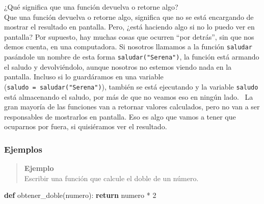 \documentclass[
  letterpaper,
  DIV=11,
  numbers=noendperiod]{scrreprt}
\newenvironment{Shaded}{\begin{snugshade}}{\end{snugshade}}
\newcommand{\ControlFlowTok}[1]{\textcolor[rgb]{0.00,0.23,0.31}{\textbf{#1}}}
\newcommand{\DecValTok}[1]{\textcolor[rgb]{0.68,0.00,0.00}{#1}}
\newcommand{\KeywordTok}[1]{\textcolor[rgb]{0.00,0.23,0.31}{\textbf{#1}}}
\newcommand{\NormalTok}[1]{\textcolor[rgb]{0.00,0.23,0.31}{#1}}
\newcommand{\OperatorTok}[1]{\textcolor[rgb]{0.37,0.37,0.37}{#1}}
\begin{document}
\begin{tcolorbox}[enhanced jigsaw, arc=.35mm, toptitle=1mm, colframe=quarto-callout-note-color-frame, bottomtitle=1mm, opacitybacktitle=0.6, colbacktitle=quarto-callout-note-color!10!white, leftrule=.75mm, coltitle=black, toprule=.15mm, titlerule=0mm, title=\textcolor{quarto-callout-note-color}{\faInfo}\hspace{0.5em}{Return vs Print}, bottomrule=.15mm, rightrule=.15mm, colback=white, breakable, opacityback=0, left=2mm]

¿Qué significa que una función devuelva o retorne algo?\\
Que una función devuelva o retorne algo, significa que no se está
encargando de mostrar el resultado en pantalla. Pero, ¿está haciendo
algo si no lo puedo ver en pantalla? Por supuesto, hay muchas cosas que
ocurren ``por detrás'', sin que nos demos cuenta, en una computadora. Si
nosotros llamamos a la función \texttt{saludar} pasándole un nombre de
esta forma \texttt{saludar("Serena")}, la función está armando el saludo
y devolviéndolo, aunque nosotros no estemos viendo nada en la pantalla.
Incluso si lo guardáramos en una variable
(\texttt{saludo\ =\ saludar("Serena")}), también se está ejecutando y la
variable \texttt{saludo} está almacenando el saludo, por más de que no
veamos eso en ningún lado.~ La gran mayoría de las funciones van a
retornar valores calculados, pero no van a ser responsables de
mostrarlos en pantalla. Eso es algo que vamos a tener que ocuparnos por
fuera, si quisiéramos ver el resultado.

\end{tcolorbox}

\subsubsection{Ejemplos}\label{ejemplos}

\begin{quote}
\textbf{Ejemplo}\\
Escribir una función que calcule el doble de un número.
\end{quote}

\begin{Shaded}
\begin{Highlighting}[]
\KeywordTok{def}\NormalTok{ obtener\_doble(numero):}
  \ControlFlowTok{return}\NormalTok{ numero }\OperatorTok{*} \DecValTok{2}
\end{Highlighting}
\end{Shaded}
\end{document}
